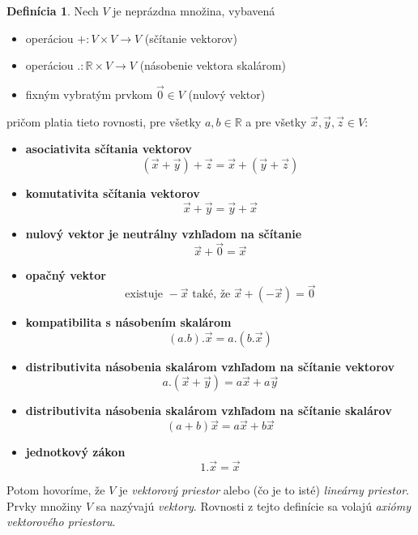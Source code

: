 \documentclass{article}
\theoremstyle{definition}
\newtheorem{definicia}{Definícia}[section]
\theoremstyle{plain}
\begin{document}
\begin{definicia}
Nech $V$ je neprázdna množina, vybavená
\begin{itemize}
    \item operáciou $+ : V \times V \longrightarrow V$ (sčítanie vektorov)
    \item operáciou $. : \mathbb{R} \times V \longrightarrow V$ (násobenie vektora skalárom)
    \item fixným vybratým prvkom $\vec{0} \in V$ (nulový vektor)
\end{itemize}
pričom platia tieto rovnosti, pre všetky $a, b \in \mathbb{R}$ a pre všetky $\vec{x}, \vec{y}, \vec{z} \in V$:

\begin{itemize}
    \item \textbf{asociativita sčítania vektorov}
    $$ (\vec{x} + \vec{y}) + \vec{z} = \vec{x} + (\vec{y} + \vec{z}) $$
   
    \item \textbf{komutativita sčítania vektorov}
    $$ \vec{x} + \vec{y} = \vec{y} + \vec{x} $$
   
    \item \textbf{nulový vektor je neutrálny vzhľadom na sčítanie}
    $$ \vec{x} + \vec{0} = \vec{x} $$
   
    \item \textbf{opačný vektor}
    $$ \text{existuje } -\vec{x} \text{ také, že } \vec{x} + (-\vec{x}) = \vec{0} $$
   
    \item \textbf{kompatibilita s násobením skalárom}
    $$ (a . b) . \vec{x} = a . (b . \vec{x}) $$
   
    \item \textbf{distributivita násobenia skalárom vzhľadom na sčítanie vektorov}
    $$ a . (\vec{x} + \vec{y}) = a\vec{x} + a\vec{y} $$
   
    \item \textbf{distributivita násobenia skalárom vzhľadom na sčítanie skalárov}
    $$ (a + b)\vec{x} = a\vec{x} + b\vec{x} $$
   
    \item \textbf{jednotkový zákon}
    $$ 1 . \vec{x} = \vec{x} $$
   
\end{itemize}
Potom hovoríme, že $V$ je \emph{vektorový priestor} alebo (čo je to isté)
\emph{lineárny priestor}. Prvky množiny $V$ sa nazývajú \emph{vektory}. Rovnosti z
tejto definície sa volajú \emph{axiómy vektorového priestoru}.
\end{definicia}
\end{document}
